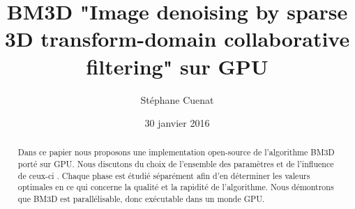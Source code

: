 \documentclass[12pt,a4paper]{memoir} %
\begin{document}
\title{BM3D "Image denoising by sparse 3D transform-domain collaborative filtering" sur GPU}
\author{\small{Stéphane Cuenat}}
\date{\small{30 janvier 2016}}
\maketitle

\begin{abstract}
Dans ce papier nous proposons une implementation open-source de l'algorithme BM3D porté sur GPU. Nous discutons du choix de l'ensemble des paramètres et de l'influence de ceux-ci . Chaque phase est étudié séparément afin d'en déterminer les valeurs optimales en ce qui concerne la qualité et la rapidité de l'algorithme. Nous démontrons que BM3D est parallélisable, donc exécutable dans un monde GPU.   

\end{abstract}

\newpage

\tableofcontents







\begin{appendix}
  \listoffigures
\end{appendix}



\end{document}
